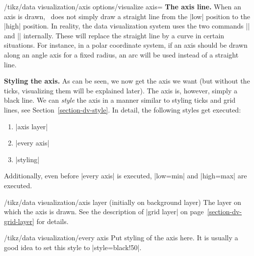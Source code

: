 \begin{key}{/tikz/data visualization/axis options/visualize axis=}
    \medskip
    \textbf{The axis line.}
    When an axis is drawn, \tikzname\ does not simply draw a straight line from
    the |low| position to the |high| position. In reality, the data
    visualization system uses the two commands |\pgfpathdvmoveto| and
    |\pgfpathdvlineto| internally. These will replace the straight line by a
    curve in certain situations. For instance, in a polar coordinate system, if
    an axis should be drawn along an angle axis for a fixed radius, an arc will
    be used instead of a straight line.


    \medskip
    \textbf{Styling the axis.}
    As can be seen, we now get the axis we want (but without the ticks,
    visualizing them will be explained later). The axis is, however, simply a
    black line. We can \emph{style} the axis in a manner similar to styling
    ticks and grid lines, see Section~\ref{section-dv-style}. In detail, the
    following styles get executed:
    \begin{enumerate}
        \item |axis layer|
        \item |every axis|
        \item |styling|
    \end{enumerate}
    Additionally, even before |every axis| is executed, |low=min| and
    |high=max| are executed.

    \begin{stylekey}{/tikz/data visualization/axis layer (initially on background layer)}
        The layer on which the axis is drawn. See the description of
        |grid layer| on page~\ref{section-dv-grid-layer} for details.
    \end{stylekey}

    \begin{stylekey}{/tikz/data visualization/every axis}
        Put styling of the axis here. It is usually a good idea to set this
        style to |style={black!50}|.
    \end{stylekey}


\end{key}
